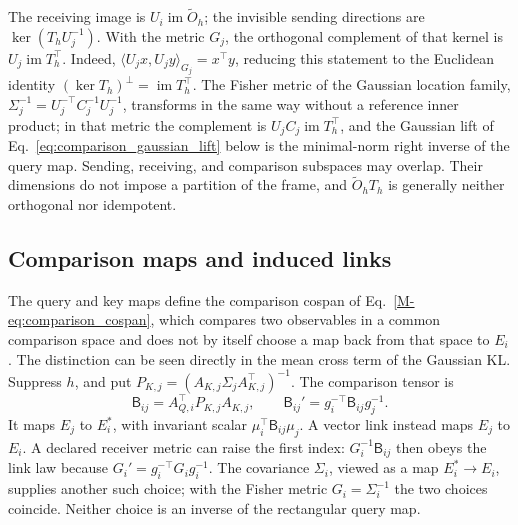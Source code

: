 \documentclass[twoside,11pt]{article}
\begin{document}
The receiving image is $U_i\operatorname{im}\widetilde O_h$; the invisible sending directions are $\ker(T_hU_j^{-1})$. With the metric $G_j$, the orthogonal complement of that kernel is $U_j\operatorname{im}T_h^\top$. Indeed, $\langle U_jx,U_jy\rangle_{G_j}=x^\top y$, reducing this statement to the Euclidean identity $(\ker T_h)^\perp=\operatorname{im}T_h^\top$. The Fisher metric of the Gaussian location family, $\Sigma_j^{-1}=U_j^{-\top}C_j^{-1}U_j^{-1}$, transforms in the same way without a reference inner product; in that metric the complement is $U_jC_j\operatorname{im}T_h^\top$, and the Gaussian lift of Eq.~\eqref{eq:comparison_gaussian_lift} below is the minimal-norm right inverse of the query map. Sending, receiving, and comparison subspaces may overlap. Their dimensions do not impose a partition of the frame, and $\widetilde O_hT_h$ is generally neither orthogonal nor idempotent.

\subsection{Comparison maps and induced links}
\label{sec:comparison_lift}

The query and key maps define the comparison cospan of Eq.~\eqref{M-eq:comparison_cospan}, which compares two observables in a common comparison space and does not by itself choose a map back from that space to $E_i$. The distinction can be seen directly in the mean cross term of the Gaussian KL. Suppress $h$, and put $P_{K,j}=(A_{K,j}\Sigma_jA_{K,j}^\top)^{-1}$. The comparison tensor is
\begin{equation}
\mathsf B_{ij}=A_{Q,i}^\top P_{K,j}A_{K,j},\qquad
\mathsf B_{ij}'=g_i^{-\top}\mathsf B_{ij}g_j^{-1}.
\label{eq:comparison_bilinear_tensor}
\end{equation}
It maps $E_j$ to $E_i^*$, with invariant scalar $\mu_i^\top\mathsf B_{ij}\mu_j$. A vector link instead maps $E_j$ to $E_i$. A declared receiver metric can raise the first index: $G_i^{-1}\mathsf B_{ij}$ then obeys the link law because $G_i'=g_i^{-\top}G_ig_i^{-1}$. The covariance $\Sigma_i$, viewed as a map $E_i^*\to E_i$, supplies another such choice; with the Fisher metric $G_i=\Sigma_i^{-1}$ the two choices coincide. Neither choice is an inverse of the rectangular query map.
\end{document}
